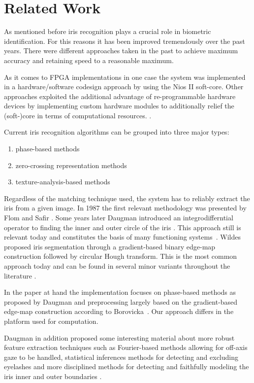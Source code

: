 \documentclass[journal]{IEEEtran}
\begin{document}
\section{Related Work}
As mentioned before iris recognition plays a crucial role in biometric identification. For this reasons it has been improved tremendously over the past years. There were different approaches taken in the past to achieve maximum accuracy and retaining speed to a reasonable maximum.
\par As it comes to FPGA implementations in one case \cite{5487592} the system was implemented in a hardware/software codesign approach by using the Nios II soft-core. Other approaches exploited the additional advantage of re-programmable hardware devices by implementing custom hardware modules to additionally relief the (soft-)core in terms of computational resources. \cite{jimenez2006fpga, mohd2004fpga, hu2010iris}.
\par Current iris recognition algorithms can be grouped into three major types:
\begin{enumerate}
	\item phase-based methods \cite{daugman1993high}
	\item zero-crossing representation methods \cite{boles1998human}
	\item texture-analysis-based methods \cite{zhu2000biometric}
\end{enumerate}
\par Regardless of the matching technique used, the system has to reliably extract the iris from a given image. In 1987 the first relevant methodology was presented by Flom and Safir \cite{flom1987iris}. Some years later Daugman introduced an integrodifferntial operator to finding the inner and outer circle of the iris \cite{daugman1993high}. This approach still is relevant today and constitutes the basis of many functioning systems~\cite{proencca2006iris}.  Wildes proposed iris segmentation through a gradient-based binary edge-map construction followed by circular Hough transform. This is the most common approach today and can be found in several minor variants throughout the literature \cite{cui2004fast, huang2004new, kong2001accurate}.
\par In the paper at hand the implementation focuses on phase-based methods as proposed by Daugman \cite{daugman1993high} and preprocessing largely based on the gradient-based edge-map construction according to Borovicka~\cite{borovicka2003circle}. Our approach differs in the platform used for computation.
\par Daugman in addition proposed some interesting material about more robust feature extraction techniques such as Fourier-based methods allowing for off-axis gaze to be handled, statistical inferences methods for detecting and excluding eyelashes and more disciplined methods for detecting and faithfully modeling the iris inner and outer boundaries \cite{4305270}.
\end{document}
